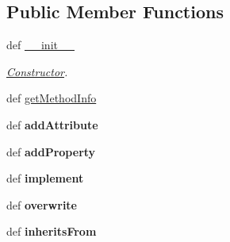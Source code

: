 \subsection*{Public Member Functions}
\begin{DoxyCompactItemize}
\item 
def \hyperlink{classgobject__creator_1_1metamodel_1_1meta__objects_1_1Class_a092944121e38ebabf41c0780ecae56b9}{\_\-\_\-init\_\-\_\-}
\begin{DoxyCompactList}\small\item\em \hyperlink{classgobject__creator_1_1metamodel_1_1meta__objects_1_1Constructor}{Constructor}. \item\end{DoxyCompactList}\item 
def \hyperlink{classgobject__creator_1_1metamodel_1_1meta__objects_1_1Class_a910fc43f8f41895ca1d6f3a7d59baa33}{getMethodInfo}
\item 
\hypertarget{classgobject__creator_1_1metamodel_1_1meta__objects_1_1Class_a937804434e3071bcd7c4d15cdedd7d26}{
def {\bfseries addAttribute}}
\label{classgobject__creator_1_1metamodel_1_1meta__objects_1_1Class_a937804434e3071bcd7c4d15cdedd7d26}

\item 
\hypertarget{classgobject__creator_1_1metamodel_1_1meta__objects_1_1Class_a9999cc90d2802dea45a437a26bd5cb07}{
def {\bfseries addProperty}}
\label{classgobject__creator_1_1metamodel_1_1meta__objects_1_1Class_a9999cc90d2802dea45a437a26bd5cb07}

\item 
\hypertarget{classgobject__creator_1_1metamodel_1_1meta__objects_1_1Class_a7dea929af4ee5bfaf4b8423b1e9c24bc}{
def {\bfseries implement}}
\label{classgobject__creator_1_1metamodel_1_1meta__objects_1_1Class_a7dea929af4ee5bfaf4b8423b1e9c24bc}

\item 
\hypertarget{classgobject__creator_1_1metamodel_1_1meta__objects_1_1Class_a1caeae0c2d4547758f7ff67d17a5f7d0}{
def {\bfseries overwrite}}
\label{classgobject__creator_1_1metamodel_1_1meta__objects_1_1Class_a1caeae0c2d4547758f7ff67d17a5f7d0}

\item 
\hypertarget{classgobject__creator_1_1metamodel_1_1meta__objects_1_1Class_a6e37c10a75c6f46ecc1970b09ac0a53c}{
def {\bfseries inheritsFrom}}
\label{classgobject__creator_1_1metamodel_1_1meta__objects_1_1Class_a6e37c10a75c6f46ecc1970b09ac0a53c}

\end{DoxyCompactItemize}
